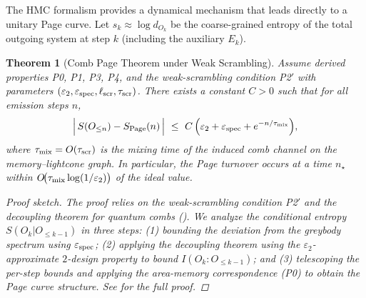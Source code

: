 \documentclass[a4paper,11pt]{article}
\newcommand{\HMC}{\textup{\textsc{HMC}}\xspace}
\theoremstyle{plain}
\newtheorem{theorem}{Theorem}
\theoremstyle{definition}
\theoremstyle{remark}
\begin{document}
The \HMC{} formalism provides a dynamical mechanism that leads directly to a unitary Page curve. Let $s_k \approx \log d_{O_k}$ be the coarse-grained entropy of the total outgoing system at step $k$ (including the auxiliary $E_k$).
%
\begin{theorem}[Comb Page Theorem under Weak Scrambling]\label{thm:comb-page-weak}
Assume derived properties P0, P1, P3, P4, and the weak-scrambling condition P2$'$ with parameters $(\varepsilon_2,\varepsilon_{\rm spec},\ell_{\rm scr},\tau_{\rm scr})$. There exists a constant $C>0$ such that for all emission steps $n$,
\begin{equation}
\Big|\, S(O_{\le n}) - S_{\rm Page}(n)\,\Big| \ \le\ C\,\Big(\varepsilon_2 + \varepsilon_{\rm spec} + e^{-n/\tau_{\rm mix}} \Big),
\end{equation}
where $\tau_{\rm mix}=O(\tau_{\rm scr})$ is the mixing time of the induced comb channel on the memory--lightcone graph. In particular, the Page turnover occurs at a time $n_\star$ within $O\!\big(\tau_{\rm mix}\log(1/\varepsilon_2)\big)$ of the ideal value.
\begin{proof}[Proof sketch]
The proof relies on the weak-scrambling condition P2$'$ and the decoupling theorem for quantum combs (). We analyze the conditional entropy $S(O_k|O_{\le k-1})$ in three steps: (1) bounding the deviation from the greybody spectrum using $\varepsilon_{\rm spec}$; (2) applying the decoupling theorem using the $\varepsilon_2$-approximate $2$-design property to bound $I(O_k:O_{\le k-1})$; and (3) telescoping the per-step bounds and applying the area-memory correspondence (P0) to obtain the Page curve structure. See  for the full proof.
\end{proof}
\end{theorem}
\end{document}
